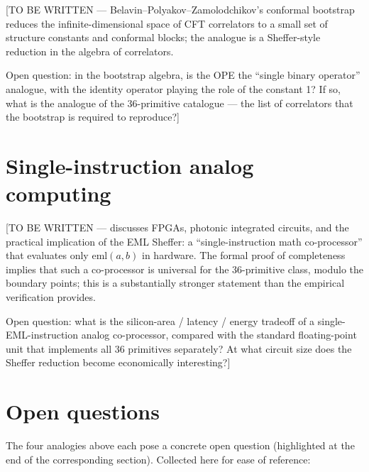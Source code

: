 \documentclass[11pt,a4paper]{article}
\newcommand{\eml}{\mathrm{eml}}
\begin{document}
[TO BE WRITTEN — Belavin--Polyakov--Zamolodchikov's conformal
bootstrap reduces the infinite-dimensional space of CFT correlators
to a small set of structure constants and conformal blocks; the
analogue is a Sheffer-style reduction in the algebra of correlators.

Open question: in the bootstrap algebra, is the OPE the ``single
binary operator'' analogue, with the identity operator playing the
role of the constant 1? If so, what is the analogue of the
36-primitive catalogue --- the list of correlators that the
bootstrap is required to reproduce?]

\section{Single-instruction analog computing}
\label{sec:analog-computing}

[TO BE WRITTEN — discusses FPGAs, photonic integrated circuits, and
the practical implication of the EML Sheffer: a ``single-instruction
math co-processor'' that evaluates only $\eml(a, b)$ in hardware. The
formal proof of completeness implies that such a co-processor is
universal for the 36-primitive class, modulo the boundary points;
this is a substantially stronger statement than the empirical
verification provides.

Open question: what is the silicon-area / latency / energy tradeoff
of a single-EML-instruction analog co-processor, compared with the
standard floating-point unit that implements all 36 primitives
separately? At what circuit size does the Sheffer reduction become
economically interesting?]

\section{Open questions}
\label{sec:open-questions}

The four analogies above each pose a concrete open question
(highlighted at the end of the corresponding section). Collected
here for ease of reference:
\end{document}
